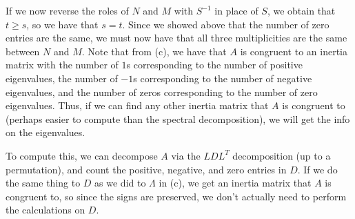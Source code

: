 \documentclass{article}
\begin{document}
If we now reverse the roles of $N$ and $M$ with $S^{-1}$ in place of $S$, we obtain that $t\geq s$, so we have that $s=t$. Since we showed above that the number of zero entries are the same, we must now have that all three multiplicities are the same between $N$ and $M$.
Note that from (c), we have that $A$ is congruent to an inertia matrix with the number of $1$s corresponding to the number of positive eigenvalues, the number of $-1$s corresponding to the number of negative eigenvalues, and the number of zeros corresponding to the number of zero eigenvalues. Thus, if we can find any other inertia matrix that $A$ is congruent to (perhaps easier to compute than the spectral decomposition), we will get the info on the eigenvalues.

To compute this, we can decompose $A$ via the $LDL^T$ decomposition (up to a permutation), and count the positive, negative, and zero entries in $D$. If we do the same thing to $D$ as we did to $\Lambda$ in (c), we get an inertia matrix that $A$ is congruent to, so since the signs are preserved, we don't actually need to perform the calculations on $D$.
\end{document}
